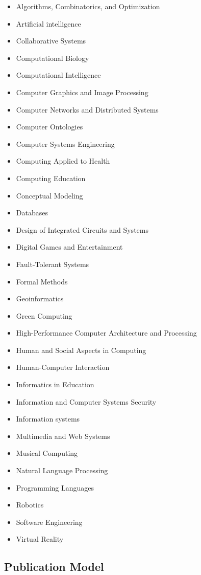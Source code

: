 \documentclass[english]{sbcreviews-2025}%
\begin{document}
\begin{itemize}

\item Algorithms, Combinatorics, and Optimization
\item Artificial intelligence
\item Collaborative Systems
\item Computational Biology
\item Computational Intelligence
\item Computer Graphics and Image Processing
\item Computer Networks and Distributed Systems
\item Computer Ontologies
\item Computer Systems Engineering
\item Computing Applied to Health
\item Computing Education
\item Conceptual Modeling
\item Databases
\item Design of Integrated Circuits and Systems
\item Digital Games and Entertainment
\item Fault-Tolerant Systems
\item Formal Methods
\item Geoinformatics
\item Green Computing
\item High-Performance Computer Architecture and Processing
\item Human and Social Aspects in Computing
\item Human-Computer Interaction
\item Informatics in Education
\item Information and Computer Systems Security
\item Information systems
\item Multimedia and Web Systems
\item Musical Computing
\item Natural Language Processing
\item Programming Languages
\item Robotics
\item Software Engineering
\item Virtual Reality
\end{itemize}

\subsection{Publication Model}
\end{document}
